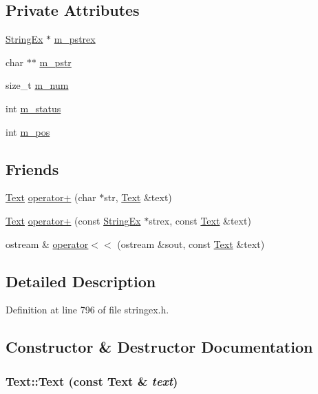 \subsection*{Private Attributes}
\begin{CompactItemize}
\item 
\hyperlink{classStringEx}{StringEx} $\ast$ \hyperlink{classText_8f53b73678399a3d4614178d26ae20e5}{m\_\-pstrex}
\item 
char $\ast$$\ast$ \hyperlink{classText_a5170832eb29a4c7d5302e99d7e870b2}{m\_\-pstr}
\item 
size\_\-t \hyperlink{classText_f2c32afcd5df78e128ee510518cdfa80}{m\_\-num}
\item 
int \hyperlink{classText_24ca99bcb2250e922ce3e85cdda5e9df}{m\_\-status}
\item 
int \hyperlink{classText_75ef67b2a17b16921a57935bd14d5a98}{m\_\-pos}
\end{CompactItemize}
\subsection*{Friends}
\begin{CompactItemize}
\item 
\hyperlink{classText}{Text} \hyperlink{classText_2d8fa31b7e559f47220611a94b95621f}{operator+} (char $\ast$str, \hyperlink{classText}{Text} \&text)
\item 
\hyperlink{classText}{Text} \hyperlink{classText_feaf47fd3ca2d35a8c585cfc501f3232}{operator+} (const \hyperlink{classStringEx}{StringEx} $\ast$strex, const \hyperlink{classText}{Text} \&text)
\item 
ostream \& \hyperlink{classText_9ed04896cb06ca94784a8bfc70017d5f}{operator$<$$<$} (ostream \&sout, const \hyperlink{classText}{Text} \&text)
\end{CompactItemize}


\subsection{Detailed Description}


Definition at line 796 of file stringex.h.

\subsection{Constructor \& Destructor Documentation}
\hypertarget{classText_72c88fc77237d52539e27042cf361a47}{
\subsubsection[{Text}]{\setlength{\rightskip}{0pt plus 5cm}Text::Text (const {\bf Text} \& {\em text})}}
\label{classText_72c88fc77237d52539e27042cf361a47}




